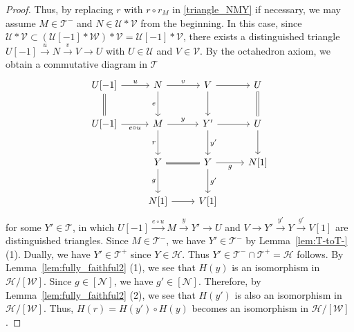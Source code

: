 \documentclass[a4paper,reqno,10pt]{amsart}
\theoremstyle{definition}
\theoremstyle{definition}
\theoremstyle{definition}
\theoremstyle{definition}
\theoremstyle{plain}
\newcommand{\CH}{\mathcal{H}}
\newcommand{\CN}{\mathcal{N}}
\newcommand{\CT}{\mathcal{T}}
\newcommand{\CU}{\mathcal{U}}
\newcommand{\CV}{\mathcal{V}}
\newcommand{\CW}{\mathcal{W}}
\begin{document}
\begin{proof}
Thus, by replacing $r$ with $r\circ r_M$ in \eqref{triangle_NMY} if necessary, we may assume $M\in\CT^-$ and $N\in\CU\ast\CV$ from the beginning.
\normalcolor
In this case, since $\CU\ast\CV\subset(\CU[-1]\ast\CW)\ast\CV=\CU[-1]\ast\CV$, there exists a distinguished triangle
$
U[-1]\xrightarrow{u}N\xrightarrow{v}V\to U
$
with $U\in\CU$ and $V\in\CV$. By the octahedron axiom, we obtain a commutative diagram in $\CT$
\[
\begin{tikzcd}[row sep=0.8cm]
U[-1]\arrow[equal]{d}{}\arrow{r}{u}
&N \arrow{r}{v}\arrow{d}[swap]{e}
&V \arrow{r}{}\arrow{d}{}
&U \arrow[equal]{d}{}
\\
U[-1] \arrow{r}[swap]{e\circ u}
&M \arrow{r}{y}
\arrow{d}[swap]{r}
&Y' \arrow{r}{}\arrow{d}{y'}
&U \arrow{d}{}\\
{}
&Y \arrow[equal]{r}{}\arrow{d}[swap]{g}
&Y \arrow{r}[swap]{g}\arrow{d}{g'}
&N[1]
\\
{}
&N[1] \arrow{r}
&V[1]
\end{tikzcd}
\]
for some $Y'\in\CT$, in which $U[-1]\xrightarrow{e\circ u}M\xrightarrow{y}Y'\to U$ and $V\to Y'\xrightarrow{y'}Y\xrightarrow{g'}V[1]$ are distinguished triangles. Since $M\in\CT^-$, we have $Y'\in\CT^-$ by Lemma~\ref{lem:T-toT-} {\rm (1)}. Dually, we have $Y'\in\CT^+$ since $Y\in\CH$. Thus $Y'\in\CT^-\cap\CT^+=\CH$ follows.
By Lemma~\ref{lem:fully_faithful2} {\rm (1)}, we see that $H(y)$ is an isomorphism in $\CH/[\CW]$. Since $g\in [\CN]$, we have $g'\in [\CN]$. Therefore, by Lemma~\ref{lem:fully_faithful2} {\rm (2)}, we see that $H(y')$ is also an isomorphism in $\CH/[\CW]$. Thus, $H(r)=H(y')\circ H(y)$ becomes an isomorphism in $\CH/[\CW]$.


\end{proof}
\end{document}
